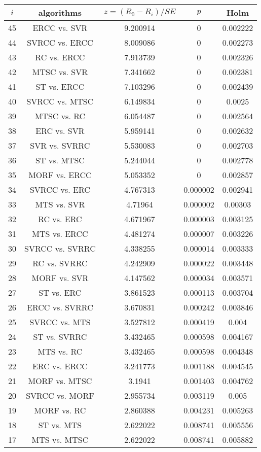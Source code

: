 \documentclass[a4paper,10pt]{article}
\begin{document}
\begin{landscape}
\begin{table}[!htp]
\centering\scriptsize
\begin{tabular}{ccccc}
$i$&algorithms&$z=(R_0 - R_i)/SE$&$p$&Holm\\
\hline45&ERCC vs. SVR&9.200914&0&0.002222\\
44&SVRCC vs. ERCC&8.009086&0&0.002273\\
43&RC vs. ERCC&7.913739&0&0.002326\\
42&MTSC vs. SVR&7.341662&0&0.002381\\
41&ST vs. ERCC&7.103296&0&0.002439\\
40&SVRCC vs. MTSC&6.149834&0&0.0025\\
39&MTSC vs. RC&6.054487&0&0.002564\\
38&ERC vs. SVR&5.959141&0&0.002632\\
37&SVR vs. SVRRC&5.530083&0&0.002703\\
36&ST vs. MTSC&5.244044&0&0.002778\\
35&MORF vs. ERCC&5.053352&0&0.002857\\
34&SVRCC vs. ERC&4.767313&0.000002&0.002941\\
33&MTS vs. SVR&4.71964&0.000002&0.00303\\
32&RC vs. ERC&4.671967&0.000003&0.003125\\
31&MTS vs. ERCC&4.481274&0.000007&0.003226\\
30&SVRCC vs. SVRRC&4.338255&0.000014&0.003333\\
29&RC vs. SVRRC&4.242909&0.000022&0.003448\\
28&MORF vs. SVR&4.147562&0.000034&0.003571\\
27&ST vs. ERC&3.861523&0.000113&0.003704\\
26&ERCC vs. SVRRC&3.670831&0.000242&0.003846\\
25&SVRCC vs. MTS&3.527812&0.000419&0.004\\
24&ST vs. SVRRC&3.432465&0.000598&0.004167\\
23&MTS vs. RC&3.432465&0.000598&0.004348\\
22&ERC vs. ERCC&3.241773&0.001188&0.004545\\
21&MORF vs. MTSC&3.1941&0.001403&0.004762\\
20&SVRCC vs. MORF&2.955734&0.003119&0.005\\
19&MORF vs. RC&2.860388&0.004231&0.005263\\
18&ST vs. MTS&2.622022&0.008741&0.005556\\
17&MTS vs. MTSC&2.622022&0.008741&0.005882\\

\end{tabular}
\end{table}
\end{landscape}
\end{document}
